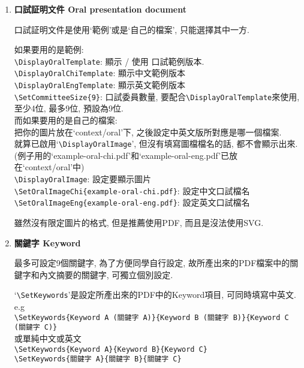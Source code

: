 \begin{enumerate}
{    使用\verb|\SetAdvisorNameA|是必須的, 而如果你的指導教授有2或3位, 那只要增加\verb|\SetAdvisorNameB|和\verb|\SetAdvisorNameC|則可.

    如: \verb|\SetAdvisorNameA{老師的中文名字}{老師的英文名字}|
  } %

  \item
  {
    \textbf{口試証明文件 Oral presentation document}

    口試証明文件是使用`範例'或是`自己的檔案', 只能選擇其中一方.

    如果要用的是範例:\\
    \verb|\DisplayOralTemplate|: 顯示 / 使用 口試範例版本.\\
    \verb|\DisplayOralChiTemplate|: 顯示中文範例版本\\
    \verb|\DisplayOralEngTemplate|: 顯示英文範例版本\\
    \verb|\SetCommitteeSize{9}|: 口試委員數量, 要配合\verb|\DisplayOralTemplate|來使用, 至少4位, 最多9位, 預設為9位.\\

    而如果要用的是自己的檔案:\\
    把你的圖片放在`context/oral'下, 之後設定中英文版所對應是哪一個檔案.\\
    就算已啟用`\verb|\DisplayOralImage|', 但沒有填寫圖檔檔名的話, 都不會顯示出來.\\
    (例子用的`example-oral-chi.pdf'和`example-oral-eng.pdf'已放在`context/oral'中)\\
    \verb|\DisplayOralImage|: 設定要顯示圖片\\
    \verb|\SetOralImageChi{example-oral-chi.pdf}|: 設定中文口試檔名\\
    \verb|\SetOralImageEng{example-oral-eng.pdf}|: 設定英文口試檔名

    雖然沒有限定圖片的格式, 但是推薦使用PDF, 而且是沒法使用SVG.
  } %

  \item
  {
    \textbf{關鍵字 Keyword}

    最多可設定9個關鍵字, 為了方便同學自行設定, 故所產出來的PDF檔案中的關鍵字和內文摘要的關鍵字, 可獨立個別設定.

    `\verb|\SetKeywords|'是設定所產出來的PDF中的Keyword項目, 可同時填寫中英文.
    e.g\\
    \verb|\SetKeywords{Keyword A (關鍵字 A)}{Keyword B (關鍵字 B)}{Keyword C (關鍵字 C)}|\\
    或單純中文或英文\\
    \verb|\SetKeywords{Keyword A}{Keyword B}{Keyword C}|\\
    \verb|\SetKeywords{關鍵字 A}{關鍵字 B}{關鍵字 C}|

}
\end{enumerate}
